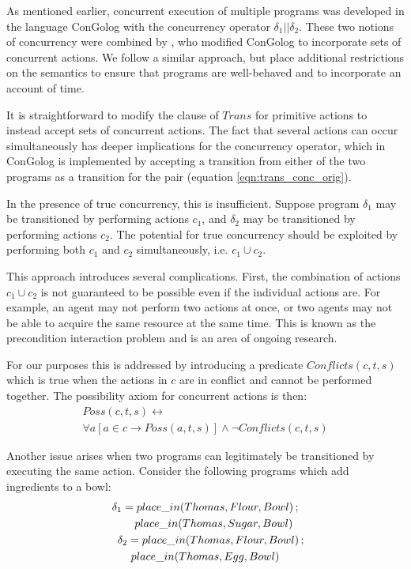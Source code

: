 \documentclass{llncs}
\begin{document}
As mentioned earlier, concurrent execution of multiple programs
was developed in the language ConGolog with the concurrency operator
$\delta_1||\delta_2$.
These two notions of concurrency were combined by
\cite{pinto99tcongolog}, who modified ConGolog to incorporate sets
of concurrent actions. We follow a similar approach, but place
additional restrictions on the semantics to ensure that programs are
well-behaved and to incorporate an account of time.

It is straightforward to modify the clause of $Trans$
for primitive actions to instead accept sets of concurrent actions.
The fact that several actions can occur simultaneously has
deeper implications for the concurrency operator, which in ConGolog
is implemented by accepting a transition from either of the two programs
as a transition for the pair (equation \ref{eqn:trans_conc_orig}).

In the presence of true concurrency, this is insufficient. Suppose program
$\delta_1$ may be transitioned by performing actions $c_1$, and
$\delta_2$ may be transitioned by performing actions $c_2$.
The potential for true concurrency should be exploited by performing both $c_1$
and $c_2$ simultaneously, i.e. $c_1 \cup c_2$.

This approach introduces several complications. First, the combination
of actions $c_{1}\cup c_{2}$ is not guaranteed to be possible even if the
individual actions are.  For example, an agent may not perform two actions
at once, or two agents may not be able to acquire the same resource at the
same time.
This is known as the precondition interaction problem \cite{pinto94temporal}
and is an area of ongoing research.

For our purposes this is addressed by introducing a predicate $Conflicts(c,t,s)$
which is true when the actions in $c$ are in conflict and cannot
be performed together. The possibility axiom for concurrent actions
is then:
\begin{multline}
\label{eqn:poss_conc_acts}
Poss(c,t,s)\leftrightarrow\\
\forall a\left[a\in c\rightarrow Poss(a,t,s)\right]\wedge\neg Conflicts(c,t,s)
\end{multline}

Another issue arises when two programs can legitimately be transitioned
by executing the same action. Consider the following programs which
add ingredients to a bowl:
\begin{multline}
\delta_{1}=place\_ in(Thomas,Flour,Bowl)\,;\\
   \shoveright{place\_ in(Thomas,Sugar,Bowl)}\\
\shoveleft{\delta_{2}=place\_ in(Thomas,Flour,Bowl)\,;}\\
   place\_ in(Thomas,Egg,Bowl)
\end{multline}
\end{document}
